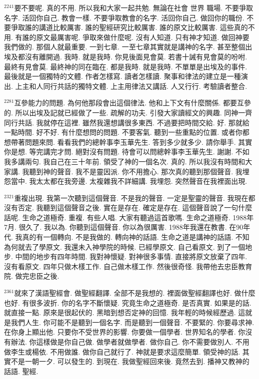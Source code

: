 \documentclass{book}
\begin{document}
$^{2241}$要不要呢.
真的不用.
所以我和大家一起共勉.
無論在社會 世界 職場.
不要爭取名字.
活回你自己.
教會一樣.
不要爭取教會的名字.
活回你自己.
做回你的職份.
不要爭取誰的講道比較厲害.
誰的聖經研究比較厲害.
誰的原文比較厲害.
這些真的不用.
有誰的原文最厲害呢.
爭取來做什麼呢.
沒有人知道.
只有神才知道.
做回神要我們做的.
那個人就最重要.
一到七章.
一至七章其實就是講神的名字.
甚至整個出埃及都沒有離開過.
我時.
就是我時.
你見後面見會莫.
若書十誡有見會莫的吩咐.
最終有見會莫.
最終神的同在臨在.
都是我時.
就是我時.
不單單是出埃及的事件.
最後就是一個獨特的文體.
作者怎樣寫.
讀者怎樣讀.
聚事和律法的建立是一種演出.
上主和人同行共話的獨特文體.
上主用律法又講話.
人又行行.
考驗讀者整合.

$^{2281}$互參能力的問題.
為何他那段會出這個律法.
他和上下文有什麼關係.
都要互參的.
所以出埃及記就已經做了一些.
疏解的功夫.
引發大家讀經文的興趣.
同神一齊同行共話.
我就停在這裡.
雖然我還想講很多東西.
不過要把時間交給.
好.
那就給一點時間.
好不好.
有什麼想問的問題.
不要客氣.
聽到一些重點的位置.
或者你都想帶著問題來問.
看看我們的總幹事李玉華先生.
答到多少就多少.
請你舉手.
其實你是想.
等完講完才問.
絕對沒有問題.
待會可以問總幹事李玉華先生.
謝謝.
不如我多講兩句.
我自己在三十年前.
領受了神的一個名次.
真的.
所以我沒有時間和大家講.
我聽到神的聲音.
我不是靈因派.
你不用擔心.
那次真的聽到那個聲音.
我埋怨當中.
我太太都在我旁邊.
太複雜我不詳細講.
我埋怨.
突然聲音在我裡面出現.

$^{2321}$重複出現.
我第一次聽到這個聲音.
不是我的聲音.
一定是聖靈的聲音.
我現在都沒有否定.
我聽到這個聲音之後.
實在是存在.
確定是存在.
這個聲音說了一句什麼話呢.
生命之道極奇.
重複.
有些人唱.
大家有聽過這首歌嗎.
生命之道極奇.
1988年7月.
很久了.
我以為.
你聽到這個聲音.
你以為很厲害.
1988年我還在教書.
在90年代.
我真的有一個轉向.
不是我做的.
轉向神的話語.
生命之道是講神的話語.
不知為何就去了學原文.
我還未入神學院的時候.
已經學原文.
自己看原文.
到了一個地步.
中間的地步有四年時間.
我對神懷疑.
對神很多事情.
直接將原文放棄了四年.
沒有看原文.
四年只做木樣工作.
自己做木樣工作.
然後很奇怪.
我帶他去忠臣教育院.
做完忠臣之後.

$^{2361}$就來了漢語聖經會.
做聖經翻譯.
全部不是我想的.
裡面做聖經翻譯也好.
做什麼也好.
有很多波折.
你的名字不斷懷疑.
究竟生命之道極奇.
是否真實.
如果是的話.
就直接一點.
原來是很起伏的.
黑暗到想否定神的回憶.
我年輕的時候經歷過.
這就是我們人生.
你可能不是聽到一個名字.
而是聽到一個聲音.
不要緊的.
你要尋求神.
在你身上顯出他.
只要你不受世界的影響.
你要做一個學者.
世界知名的學者.
你沒有辦法.
你這樣做是你自己做.
做學者就做學者.
做你自己.
你不需要做別人.
不用做李生或楊依.
不用做誰.
做你自己就行了.
神就是要求這麼簡單.
領受神的話.
其實不是一朝一夕.
可以發生的.
到現在.
我做聖經回來後.
竟然去到.
播神又教神的話語.
聖經.
\end{document}
